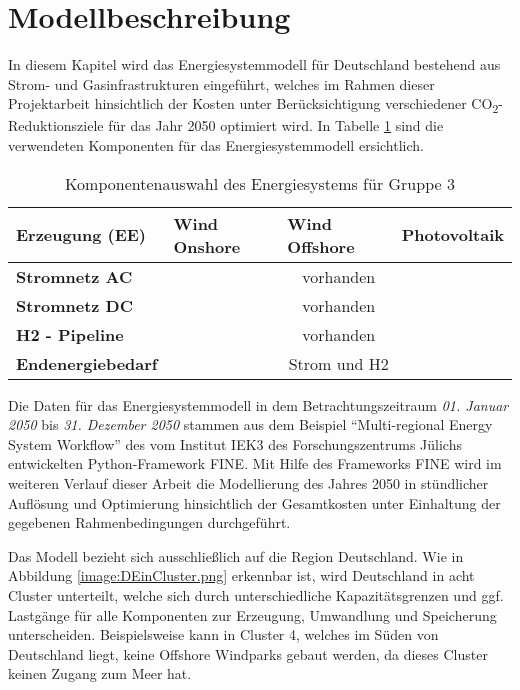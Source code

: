 \section{Modellbeschreibung}
\label{chap:modellbeschreibung}
In diesem Kapitel wird das Energiesystemmodell für Deutschland bestehend aus Strom- und Gasinfrastrukturen eingeführt, welches im Rahmen dieser Projektarbeit hinsichtlich der Kosten unter Berücksichtigung verschiedener CO\textsubscript{2}-Reduktionsziele für das Jahr 2050 optimiert wird. In Tabelle \ref{tab:systemdesign2} sind die verwendeten Komponenten für das Energiesystemmodell ersichtlich.

\begin{table}[ht!]
    \centering
    \begin{tabular}{|lcll|}
        \hline
        \multicolumn{1}{|l|}{\textbf{Erzeugung (EE)}} & \multicolumn{1}{l|}{Wind Onshore} & \multicolumn{1}{l|}{Wind Offshore} & Photovoltaik \\ \hline
        \multicolumn{1}{|l|}{\textbf{Stromnetz AC}}     & \multicolumn{3}{c|}{vorhanden}                \\ \hline
        \multicolumn{1}{|l|}{\textbf{Stromnetz DC}}     & \multicolumn{3}{c|}{vorhanden}                \\ \hline
        \multicolumn{1}{|l|}{\textbf{H2 - Pipeline}}    & \multicolumn{3}{c|}{vorhanden}                \\ \hline
        \multicolumn{1}{|l|}{\textbf{Endenergiebedarf}} & \multicolumn{3}{c|}{Strom und H2} \\ \hline
    \end{tabular}
    \caption{Komponentenauswahl des Energiesystems für Gruppe 3}
    \label{tab:systemdesign2}
\end{table}


Die Daten für das Energiesystemmodell in dem Betrachtungszeitraum \textit{01. Januar 2050} bis \textit{31. Dezember 2050} stammen aus dem Beispiel ``Multi-regional Energy System Workflow'' des vom Institut IEK3 des Forschungszentrums Jülichs entwickelten Python-Framework FINE. \cite{WELDER20181130}
Mit Hilfe des Frameworks FINE wird im weiteren Verlauf dieser Arbeit die Modellierung des Jahres 2050 in stündlicher Auflösung und Optimierung hinsichtlich der Gesamtkosten unter Einhaltung der gegebenen Rahmenbedingungen durchgeführt.


Das Modell bezieht sich ausschließlich auf die Region Deutschland. Wie in Abbildung \ref{image:DEinCluster.png} erkennbar ist, wird Deutschland in acht Cluster unterteilt, welche sich durch unterschiedliche Kapazitätsgrenzen und ggf. Lastgänge für alle Komponenten zur Erzeugung, Umwandlung und Speicherung  unterscheiden. Beispielsweise kann in Cluster 4, welches im Süden von Deutschland liegt, keine Offshore Windparks gebaut werden, da dieses Cluster keinen Zugang zum Meer hat. 


